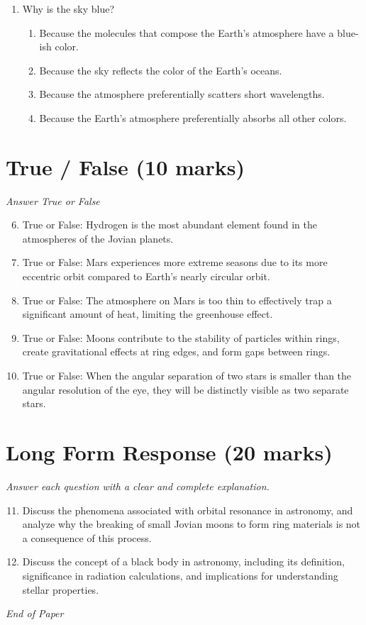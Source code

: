 \documentclass[12pt]{article}
\begin{document}
\begin{enumerate}[label=\arabic*.]
\begin{enumerate}[label=(\alph*)]
    \item 12
\end{enumerate}
\item Why is the sky blue?
\begin{enumerate}[label=(\alph*)]
    \item Because the molecules that compose the Earth's atmosphere have a blue-ish color.
    \item Because the sky reflects the color of the Earth's oceans.
    \item Because the atmosphere preferentially scatters short wavelengths.
    \item Because the Earth's atmosphere preferentially absorbs all other colors.
\end{enumerate}
\end{enumerate}

\section*{True / False (10 marks)}
\textit{Answer True or False}
\begin{enumerate}[label=\arabic*.]
\setcounter{enumi}{5}
\item True or False: Hydrogen is the most abundant element found in the atmospheres of the Jovian planets.
\item True or False: Mars experiences more extreme seasons due to its more eccentric orbit compared to Earth's nearly circular orbit.
\item True or False: The atmosphere on Mars is too thin to effectively trap a significant amount of heat, limiting the greenhouse effect.
\item True or False: Moons contribute to the stability of particles within rings, create gravitational effects at ring edges, and form gaps between rings.
\item True or False: When the angular separation of two stars is smaller than the angular resolution of the eye, they will be distinctly visible as two separate stars.
\end{enumerate}

\section*{Long Form Response (20 marks)}
\textit{Answer each question with a clear and complete explanation.}
\begin{enumerate}[label=\arabic*.]
\setcounter{enumi}{10}
\item Discuss the phenomena associated with orbital resonance in astronomy, and analyze why the breaking of small Jovian moons to form ring materials is not a consequence of this process.
\item Discuss the concept of a black body in astronomy, including its definition, significance in radiation calculations, and implications for understanding stellar properties.
\end{enumerate}

\vfill
\noindent\textit{End of Paper}
\end{document}

